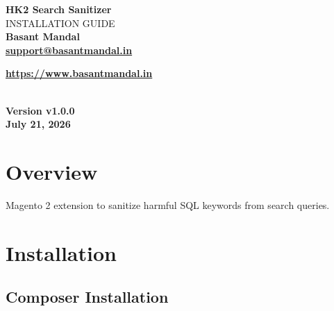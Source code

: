 \documentclass[11pt,a4paper]{article}
\begin{document}
\begin{titlepage}
\centering

\vspace*{4cm}

{\Huge\bfseries HK2 Search Sanitizer}\\[0.6cm]

{\Large INSTALLATION GUIDE}\\[2.5cm]

{\Large \textbf{Basant Mandal}}\\[0.9cm]

\href{mailto:support@basantmandal.in}{\textbf{support@basantmandal.in}}

\vspace{0.3cm}

\href{https://www.basantmandal.in}{\textbf{https://www.basantmandal.in}}

\\[5cm]

{\textbf{Version v1.0.0}}\\[0.3cm]

{\textbf{July 21, 2026}}\\[4cm]

\vfill

\end{titlepage}

\tableofcontents
\newpage

\section{Overview}

Magento 2 extension to sanitize harmful SQL keywords from search queries.

\section{Installation}

\subsection{Composer Installation}
\end{document}
